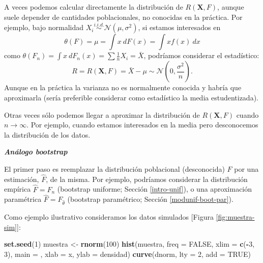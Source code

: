 \documentclass[
]{book}
\newenvironment{Shaded}{\begin{snugshade}}{\end{snugshade}}
\newcommand{\AttributeTok}[1]{\textcolor[rgb]{0.13,0.29,0.53}{#1}}
\newcommand{\ConstantTok}[1]{\textcolor[rgb]{0.56,0.35,0.01}{#1}}
\newcommand{\DecValTok}[1]{\textcolor[rgb]{0.00,0.00,0.81}{#1}}
\newcommand{\FunctionTok}[1]{\textcolor[rgb]{0.13,0.29,0.53}{\textbf{#1}}}
\newcommand{\NormalTok}[1]{#1}
\newcommand{\OtherTok}[1]{\textcolor[rgb]{0.56,0.35,0.01}{#1}}
\newcommand{\SpecialCharTok}[1]{\textcolor[rgb]{0.81,0.36,0.00}{\textbf{#1}}}
\newcommand{\StringTok}[1]{\textcolor[rgb]{0.31,0.60,0.02}{#1}}
\renewcommand{\mathbf}[1]{\symbf{#1}}
\theoremstyle{break}
\theoremstyle{nonumberplain}
\begin{document}
A veces podemos calcular directamente la distribución de \(R\left( \mathbf{X},F \right)\),
aunque suele depender de cantidades poblacionales,
no conocidas en la práctica.
Por ejemplo, bajo normalidad \(X_i \overset{i.i.d.}{\sim}
\mathcal{N}\left( \mu ,\sigma^2 \right)\), si estamos interesados en
\[\theta \left( F \right) =\mu =\int x~dF\left( x \right) =\int xf\left( x \right) ~dx\]
como \(\theta \left( F_n \right) = \int x~dF_n\left( x \right) =
\sum \frac{1}{n}X_i = \bar{X}\), podríamos considerar el estadístico:
\[R=R\left( \mathbf{X},F \right) = \bar{X} - \mu \sim \mathcal{N}\left( 0 ,\frac{\sigma^2}{n} \right).\]
Aunque en la práctica la varianza no es normalmente conocida y habría que aproximarla
(sería preferible considerar como estadístico la media estudentizada).

Otras veces sólo podemos llegar a aproximar la distribución de
\(R\left( \mathbf{X},F \right)\) cuando \(n \rightarrow \infty\).
Por ejemplo, cuando estamos interesados en la media pero desconocemos la
distribución de los datos.

\textbf{\emph{Análogo bootstrap}}

El primer paso es reemplazar la distribución poblacional (desconocida) \(F\) por una
estimación, \(\hat{F}\), de la misma. Por ejemplo, podríamos considerar la
distribución empírica \(\hat{F}=F_n\) (bootstrap uniforme; Sección \ref{intro-unif}),
o una aproximación paramétrica \(\hat{F}=F_{\hat \theta}\) (bootstrap paramétrico; Sección \ref{modunif-boot-par}).

Como ejemplo ilustrativo consideramos los datos simulados {[}Figura \ref{fig:muestra-sim}{]}:

\begin{Shaded}
\begin{Highlighting}[]
\FunctionTok{set.seed}\NormalTok{(}\DecValTok{1}\NormalTok{)}
\NormalTok{muestra }\OtherTok{\textless{}{-}} \FunctionTok{rnorm}\NormalTok{(}\DecValTok{100}\NormalTok{)}
\FunctionTok{hist}\NormalTok{(muestra, }\AttributeTok{freq =} \ConstantTok{FALSE}\NormalTok{, }\AttributeTok{xlim =} \FunctionTok{c}\NormalTok{(}\SpecialCharTok{{-}}\DecValTok{3}\NormalTok{, }\DecValTok{3}\NormalTok{),}
     \AttributeTok{main =} \StringTok{\textquotesingle{}\textquotesingle{}}\NormalTok{, }\AttributeTok{xlab =} \StringTok{\textquotesingle{}x\textquotesingle{}}\NormalTok{, }\AttributeTok{ylab =} \StringTok{\textquotesingle{}densidad\textquotesingle{}}\NormalTok{)}
\FunctionTok{curve}\NormalTok{(dnorm, }\AttributeTok{lty =} \DecValTok{2}\NormalTok{, }\AttributeTok{add =} \ConstantTok{TRUE}\NormalTok{)}
\end{Highlighting}
\end{Shaded}
\end{document}
